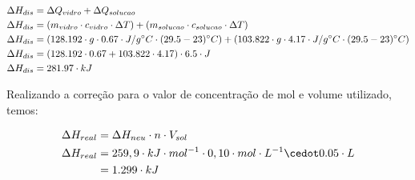             \begin{equation}
                \begin{split}
                	\notag
                    \Delta{H_{dis}} &= \Delta Q_{vidro} + \Delta Q_{solucao} \\
                    \Delta{H_{dis}} &= (m_{vidro} \cdot c_{vidro} \cdot \Delta T) + (m_{solucao} \cdot c_{solucao} \cdot \Delta T) \\
                    \Delta{H_{dis}} &= (128.192 \cdot g \cdot 0.67 \cdot J / g ^{\circ}C \cdot (29.5 - 23)^{\circ}C) + (103.822 \cdot g \cdot 4.17 \cdot J / g ^{\circ}C \cdot (29.5 - 23)^{\circ}C) \\
                    \Delta{H_{dis}} &= (128.192 \cdot 0.67 + 103.822 \cdot 4.17) \cdot 6.5 \cdot J \\
                    \Delta{H_{dis}} &= 281.97 \cdot kJ
                \end{split}
            \end{equation}
        
        \indent Realizando a correção para o valor de concentração de mol e volume utilizado, temos:\
        
                    \begin{equation}
        	\begin{split}
        		\notag
        		\Delta{H_{real}} &= \Delta{H_{neu}} \cdot n \cdot V_{sol}\\
        		\Delta{H_{real}} &= 259,9 \cdot kJ \cdot mol^{-1} \cdot 0,10 \cdot mol \cdot L^{-1} \cedot 0.05 \cdot L \\
        		&= 1.299 \cdot kJ
        	\end{split}
        \end{equation}
        
        

